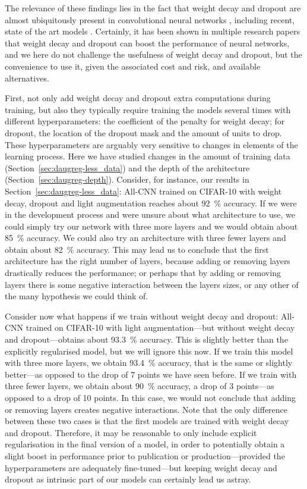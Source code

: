 {The relevance of these findings lies in the fact that weight decay and dropout are almost ubiquitously present in convolutional neural networks \citep{huang2017densenet, zagoruyko2016wrn, springenberg2014allcnn}, including recent, state of the art models \citep{tan2019efficientnet}. Certainly, it has been shown in multiple research papers that weight decay and dropout can boost the performance of neural networks, and we here do not challenge the usefulness of weight decay and dropout, but the convenience to use it, given the associated cost and risk, and available alternatives. 

First, not only add weight decay and dropout extra computations during training, but also they typically require training the models several times with different hyperparameters: the coefficient of the penalty for weight decay; for dropout, the location of the dropout mask and the amount of units to drop. These hyperparameters are arguably very sensitive to changes in elements of the learning process. Here we have studied changes in the amount of training data (Section~\ref{sec:daugreg-less_data}) and the depth of the architecture (Section~\ref{sec:daugreg-depth}). Consider, for instance, our results in Section~\ref{sec:daugreg-less_data}: All-CNN trained on CIFAR-10 with weight decay, dropout and light augmentation reaches about 92~\% accuracy. If we were in the development process and were unsure about what architecture to use, we could simply try our network with three more layers and we would obtain about 85~\% accuracy. We could also try an architecture with three fewer layers and obtain about 82~\% accuracy. This may lead us to conclude that the first architecture has the right number of layers, because adding or removing layers drastically reduces the performance; or perhaps that by adding or removing layers there is some negative interaction between the layers sizes, or any other of the many hypothesis we could think of.

Consider now what happens if we train without weight decay and dropout: All-CNN trained on CIFAR-10 with light augmentation---but without weight decay and dropout---obtains about 93.3~\% accuracy. This is slightly better than the explicitly regularised model, but we will ignore this now. If we train this model with three more layers, we obtain 93.4~\% accuracy, that is the same or slightly better---as opposed to the drop of 7 points we have seen before. If we train with three fewer layers, we obtain about 90~\% accuracy, a drop of 3 points---as opposed to a drop of 10 points. In this case, we would not conclude that adding or removing layers creates negative interactions. Note that the only difference between these two cases is that the first models are trained with weight decay and dropout. Therefore, it may be reasonable to only include explicit regularisation in the final version of a model, in order to potentially obtain a slight boost in performance prior to publication or production---provided the hyperparameters are adequately fine-tuned---but keeping weight decay and dropout as intrinsic part of our models can certainly lead us astray.

}
